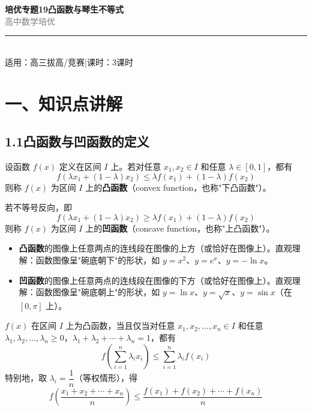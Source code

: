 \documentclass[12pt, a4paper]{ctexart}
\begin{document}
\begin{center}
{\Huge\bfseries\textcolor{mainblue}{培优专题19\quad 凸函数与琴生不等式}}\\[12pt]
{\Large\textcolor{gray}{高\;中\;数\;学\;培\;优}}\\[8pt]
\rule{0.6\textwidth}{1pt}\\[8pt]
{\normalsize 适用：高三拔高/竞赛\quad |\quad 课时：3课时}
\end{center}
\vspace{10pt}

\section*{\textcolor{mainblue}{一、知识点讲解}}

\subsection*{1.1\quad 凸函数与凹函数的定义}

\begin{knowledgebox}[凸函数的定义]
设函数 $f(x)$ 定义在区间 $I$ 上。若对任意 $x_1, x_2 \in I$ 和任意 $\lambda \in [0, 1]$，都有
$$f(\lambda x_1 + (1-\lambda)x_2) \leq \lambda f(x_1) + (1-\lambda)f(x_2)$$
则称 $f(x)$ 为区间 $I$ 上的\textbf{凸函数}（convex function，也称"下凸函数"）。

若不等号反向，即
$$f(\lambda x_1 + (1-\lambda)x_2) \geq \lambda f(x_1) + (1-\lambda)f(x_2)$$
则称 $f(x)$ 为区间 $I$ 上的\textbf{凹函数}（concave function，也称"上凸函数"）。
\end{knowledgebox}

\begin{tipbox}[凸函数的几何意义]
\begin{itemize}
  \item \textbf{凸函数}的图像上任意两点的连线段在图像的上方（或恰好在图像上）。直观理解：函数图像呈"碗底朝下"的形状，如 $y = x^2$、$y = e^x$、$y = -\ln x$。
  \item \textbf{凹函数}的图像上任意两点的连线段在图像的下方（或恰好在图像上）。直观理解：函数图像呈"碗底朝上"的形状，如 $y = \ln x$、$y = \sqrt{x}$、$y = \sin x$（在 $[0, \pi]$ 上）。
\end{itemize}
\end{tipbox}

\begin{knowledgebox}
$f(x)$ 在区间 $I$ 上为凸函数，当且仅当对任意 $x_1, x_2, \ldots, x_n \in I$ 和任意 $\lambda_1, \lambda_2, \ldots, \lambda_n \geq 0$，$\lambda_1 + \lambda_2 + \cdots + \lambda_n = 1$，都有
$$f\!\left(\sum_{i=1}^n \lambda_i x_i\right) \leq \sum_{i=1}^n \lambda_i f(x_i)$$
特别地，取 $\lambda_i = \dfrac{1}{n}$（等权情形），得
$$f\!\left(\frac{x_1 + x_2 + \cdots + x_n}{n}\right) \leq \frac{f(x_1) + f(x_2) + \cdots + f(x_n)}{n}$$
\end{knowledgebox}
\end{document}
